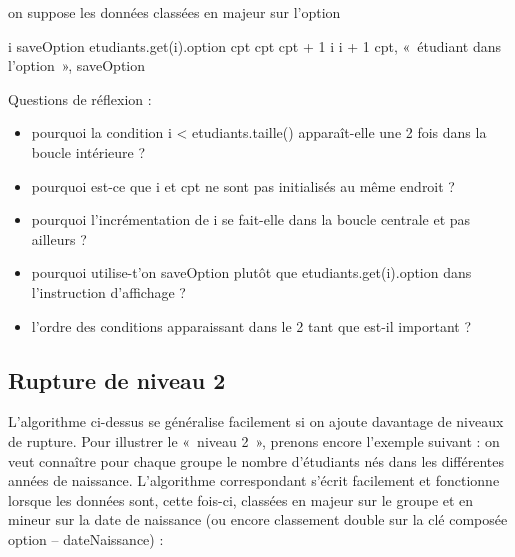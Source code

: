 	\begin{LDA}
		\label{algo:rupt1}
			\LComment on suppose les données classées en majeur sur l’option
	
			\Let i 
				\Let saveOption \Gets etudiants.get(i).option
				\Let cpt 
					\Let cpt \Gets cpt + 1
					\Let i \Gets i + 1
				\EndWhile
				\Write cpt, «~étudiant dans l’option~», saveOption
			\EndWhile
		\EndAlgo
	\end{LDA}

	\medskip
	Questions de réflexion :
	\begin{itemize}
		\item 
			pourquoi la condition \textsf{i < etudiants.taille()}
			apparaît-elle une 2\ieme{} fois dans la boucle intérieure ?
		\item 
			pourquoi est-ce que \textsf{i} et \textsf{cpt} 
			ne sont pas initialisés au même endroit ?
		\item 
			pourquoi l'incrémentation de \textsf{i} se fait-elle dans la boucle centrale 
			et pas ailleurs ?
		\item 
			pourquoi utilise-t'on 
			\textsf{saveOption} plutôt que \textsf{etudiants.get(i).option}
			dans l’instruction d’affichage ?
		\item 
			l’ordre des conditions apparaissant dans le 2\ieme{} \og{}tant que\fg{} 
			est-il important ?
	\end{itemize}

\subsection*{Rupture de niveau 2}

	L’algorithme ci-dessus se généralise facilement si on ajoute davantage de niveaux de rupture. 
	Pour illustrer le «~niveau 2~», prenons encore l’exemple suivant : 
	on veut connaître pour chaque groupe le nombre d’étudiants nés dans les différentes années de naissance. 
	L’algorithme correspondant s’écrit facilement et fonctionne lorsque les données sont, cette fois-ci,
	classées en majeur sur le groupe et en mineur sur la date de naissance
	(ou encore classement double sur la clé composée option – dateNaissance) :
	
